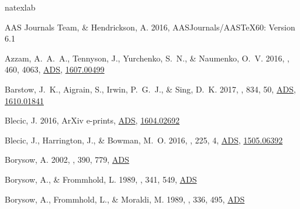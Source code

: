 \documentclass[tighten, times, twocolumn]{aastex61}  %
\newcommand{\eprint}[1]{\href{http://arxiv.org/abs/#1}{#1}}
\renewcommand{\eprint}[1]{\href{http://arxiv.org/abs/#1}{#1}}
\providecommand{\adsurl}[1]{\href{#1}{ADS}}
\begin{document}

%
\begin{thebibliography}{50}
\expandafter\ifx\csname natexlab\endcsname\relax\def\natexlab#1{#1}\fi

{AAS Journals Team}, \& {Hendrickson}, A. 2016, AASJournals/AASTeX60: Version
  6.1

{Azzam}, A.~A.~A., {Tennyson}, J., {Yurchenko}, S.~N., \& {Naumenko}, O.~V.
  2016, \mnras, 460, 4063,
  \adsurl{http://adsabs.harvard.edu/abs/2016MNRAS.460.4063A},
  \eprint{1607.00499}

{Barstow}, J.~K., {Aigrain}, S., {Irwin}, P.~G.~J., \& {Sing}, D.~K. 2017,
  \apj, 834, 50, \adsurl{http://adsabs.harvard.edu/abs/2017ApJ...834...50B},
  \eprint{1610.01841}

{Blecic}, J. 2016, ArXiv e-prints,
  \adsurl{http://adsabs.harvard.edu/abs/2016arXiv160402692B},
  \eprint{1604.02692}

{Blecic}, J., {Harrington}, J., \& {Bowman}, M.~O. 2016, \apjs, 225, 4,
  \adsurl{http://adsabs.harvard.edu/abs/2016ApJS..225....4B},
  \eprint{1505.06392}

{Borysow}, A. 2002, \aap, 390, 779,
  \adsurl{http://adsabs.harvard.edu/abs/2002A\%26A...390..779B}

{Borysow}, A., \& {Frommhold}, L. 1989, \apj, 341, 549,
  \adsurl{http://adsabs.harvard.edu/abs/1989ApJ...341..549B}

{Borysow}, A., {Frommhold}, L., \& {Moraldi}, M. 1989, \apj, 336, 495,
  \adsurl{http://adsabs.harvard.edu/abs/1989ApJ...336..495B}


\end{thebibliography}
\end{document}
